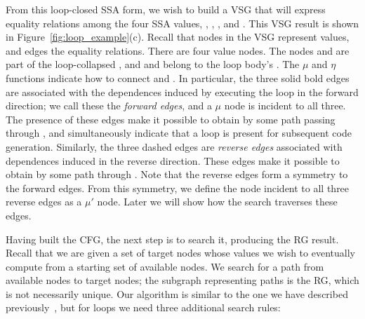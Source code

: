 From this loop-closed SSA form, we wish to build a VSG that will express equality relations among the four SSA values, \vinit, \vfinal, \vmu, and \viter.
This VSG result is shown in Figure~\ref{fig:loop_example}(c).
Recall that nodes in the VSG represent values, and edges the equality relations.
%
%
%
There are four value nodes.
The nodes \vinit and \vfinal are part of the loop-collapsed \pVSG, and \vmu and \viter belong to the loop body's \lVSG.
The $\mu$ and $\eta$ functions indicate how to connect \pVSG and \lVSG.
In particular, the three solid bold edges are associated with the dependences induced by executing the loop in the forward direction;
we call these the \emph{forward edges}, and a $\mu$ node is incident to all three.
The presence of these edges make it possible to obtain \vfinal by some path passing through \lVSG, and simultaneously indicate that a loop is present for subsequent code generation.
Similarly, the three dashed edges are \emph{reverse edges} associated with dependences induced in the reverse direction.
These edges make it possible to obtain \vinit by some path through \lVSG.
Note that the reverse edges form a symmetry to the forward edges.
From this symmetry, we define the node incident to all three reverse edges as a $\mu'$ node.
Later we will show how the search traverses these edges.

Having built the CFG, the next step is to search it, producing the RG result.
Recall that we are given a set of target nodes whose values we wish to eventually compute from a starting set of available nodes.
We search for a path from available nodes to target nodes; the subgraph representing paths is the RG, which is not necessarily unique.
Our algorithm is similar to the one we have described previously~\cite{Hou2012}, but for loops we need three additional search rules:

